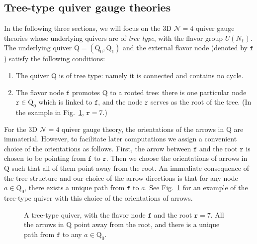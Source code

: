 \documentclass[12pt,a4paper]{article}
\renewcommand{\(}{\left(}
\renewcommand{\)}{\right)}
\renewcommand{\(}{\left(}
\renewcommand{\)}{\right)}
\begin{document}
\subsection{Tree-type quiver gauge theories}\label{ssec:tree-type_quiver}

In the following three sections, we will focus on the  3D $\mathcal{N}=4$ quiver gauge theories whose underlying quivers are of \textit{tree type}, with the flavor group $U(N_{\mathtt{f}})$.
The underlying quiver $\mathrm{Q}=(\mathrm{Q}_0,\mathrm{Q}_1)$ and the external flavor node (denoted by $\mathtt{f}$)   satisfy the following conditions:
\begin{enumerate}
\item The quiver $\mathrm{Q}$ is of tree type: namely it is connected and contains no cycle. 
\item The flavor node $\mathtt{f}$ promotes $\mathrm{Q}$ to a rooted tree: there is one particular node $\mathtt{r}\in \mathrm{Q}_0$ which is linked to $\mathtt{f}$, and the node $\mathtt{r}$ serves as the root of the tree. 
(In the example in Fig.~\ref{fig:tree-qui}, $\mathtt{r}=7$.)



\end{enumerate}

For the 3D $\mathcal{N}=4$ quiver gauge theory, the orientations of the arrows in $\mathrm{Q}$ are immaterial. 
However, to facilitate later computations we assign a convenient choice of the orientations as follows.
First, the arrow between $\mathtt{f}$ and the root $\mathtt{r}$ is chosen to be pointing from $\mathtt{f}$ to $\mathtt{r}$.
Then we choose the orientations of  arrows in $\mathrm{Q}$ such that all of them  point away from the root.
An immediate consequence of the tree structure and our choice of the arrow directions is that for any node $a\in \mathrm{Q}_0$, there exists a unique path from $\mathtt{f}$ to $a$. 
See Fig.~\ref{fig:tree-qui} for an example of the tree-type quiver with this choice of the orientations of arrows.
\begin{figure}[h!]
\centering
{}
\caption{A tree-type quiver, with the flavor node $\mathtt{f}$ and the root $\mathtt{r}=7$. All the arrows in $\mathrm{Q}$ point away from the root, and there is a unique path from $\mathtt{f}$ to any $a\in \mathrm{Q}_0$.  }
\label{fig:tree-qui}
\end{figure}
\end{document}
